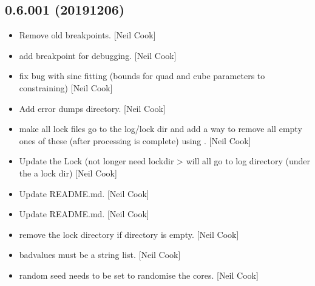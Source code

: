 \documentclass[a4paper,10pt,english]{report}
\begin{document}
\subsection{0.6.001 (2019\sphinxhyphen{}12\sphinxhyphen{}06)}
\label{\detokenize{misc/changelog:id37}}\begin{itemize}
\item {} 
Remove old breakpoints. {[}Neil Cook{]}

\item {} 
 \sphinxhyphen{} add breakpoint for debugging. {[}Neil Cook{]}

\item {} 
 \sphinxhyphen{} fix bug with sinc fitting (bounds for quad and cube
parameters to constraining) {[}Neil Cook{]}

\item {} 
Add error dumps directory. {[}Neil Cook{]}

\item {} 
 \sphinxhyphen{} make all lock files go to the log/lock dir and add a
way to remove all empty ones of these (after processing is complete)
using . {[}Neil Cook{]}

\item {} 
Update the Lock (not longer need lockdir \textendash{}\textgreater{} will all go to log
directory (under the a lock dir) {[}Neil Cook{]}

\item {} 
Update README.md. {[}Neil Cook{]}

\item {} 
Update README.md. {[}Neil Cook{]}

\item {} 
 \sphinxhyphen{} remove the lock directory if directory is empty.
{[}Neil Cook{]}

\item {} 
 \sphinxhyphen{} badvalues must be a string list. {[}Neil Cook{]}

\item {} 
 \sphinxhyphen{} random seed needs to be set to randomise
the cores. {[}Neil Cook{]}

\end{itemize}
\end{document}
